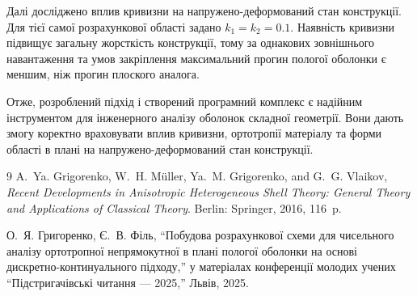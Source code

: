 Далі досліджено вплив кривизни на напружено-деформований стан конструкції. Для тієї самої розрахункової області задано $k_1=k_2=0.1$. Наявність кривизни підвищує загальну жорсткість конструкції, тому за однакових зовнішнього навантаження та умов закріплення максимальний прогин пологої оболонки є меншим, ніж прогин плоского аналога.

\begin{center}
\begin{minipage}{0.72\textwidth}
  \centering
\end{minipage}
\end{center}

Отже, розроблений підхід і створений програмний комплекс є надійним інструментом для інженерного аналізу оболонок складної геометрії. Вони дають змогу коректно враховувати вплив кривизни, ортотропії матеріалу та форми області в плані на напружено-деформований стан конструкції.

\renewcommand{\refname}{Список використаних джерел}
\begin{thebibliography}{9}
A.~Ya. Grigorenko, W.~H. Müller, Ya.~M. Grigorenko, and G.~G. Vlaikov,
\emph{Recent Developments in Anisotropic Heterogeneous Shell Theory: General Theory and Applications of Classical Theory}.
Berlin: Springer, 2016, 116~p.

О.~Я. Григоренко, Є.~В. Філь,
``Побудова розрахункової схеми для чисельного аналізу ортотропної непрямокутної в плані пологої оболонки на основі дискретно-континуального підходу,''
у матеріалах конференції молодих учених ``Підстригачівські читання --- 2025,'' Львів, 2025.
\end{thebibliography}
